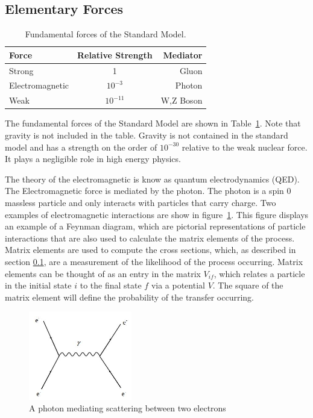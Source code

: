\documentclass[oneside, letterpaper, oldfontcommands]{memoir}
\begin{document}
\subsection{Elementary Forces}\label{elemforces}

\begin{table}[htbp]
  \centering
  \begin{tabular}{ | l | c | r |}
    \hline
    Force & Relative Strength & Mediator \\ \hline \hline
    Strong & 1 & Gluon \\ \hline
    Electromagnetic & $10^{-3}$ & Photon \\ \hline
    Weak & $10 ^{-11}$ & W,Z Boson \\ \hline
    
  \end{tabular}
  \caption{Fundamental forces of the Standard Model\cite{Halzen:1984mc}.}
  \label{tab:FundForces}
\end{table}

\qquad The fundamental forces of the Standard Model are shown in Table~\ref{tab:FundForces}. Note that gravity is not included in the table. Gravity is not contained in the standard model and has a strength on the order of $10^{-30}$ \cite{Barger:0201058766} relative to the weak nuclear force. It plays a negligible role in high energy physics.

\qquad The theory of the electromagnetic is know as quantum electrodynamics (QED). The Electromagnetic force is mediated by the photon. The photon is a spin 0 massless particle and only interacts with particles that carry charge. Two examples of electromagnetic interactions are show in figure~\ref{fig:eeScattering}. This figure displays an example of a Feynman diagram, which are pictorial representations of particle interactions that are also used to calculate the matrix elements of the process. Matrix elements are used to compute the cross sections, which, as described in section \ref{elemforces}, are a measurement of the likelihood of the process occurring. Matrix elements can be thought of as an entry in the matrix $V_{if}$, which relates a particle in the initial state $i$ to the final state $f$ via a potential $V$. The square of the matrix element will define the probability of the transfer occurring. 

\begin{figure}[here]
\includegraphics[width=0.4\textwidth]{eeScattering.jpg}
\caption{A photon mediating scattering between two electrons}
\label{fig:eeScattering}
\end{figure}
\end{document}
